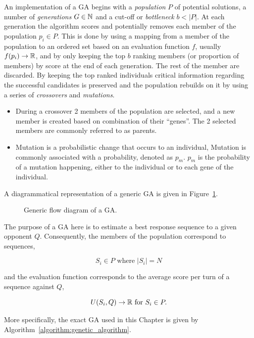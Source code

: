 An implementation of a GA begins with a \textit{population} \(P\) of
potential solutions, a number of \textit{generations} \(G \in \mathbb{N}\) and a cut-off or
\textit{bottleneck} \(b < |P|\). At each generation the algorithm scores and potentially
removes each member of the population \(p_i \in P\). This is done by using a
mapping from a member of the population to an ordered set based on an evaluation
function \(f\), usually \(f(p_i) \to \mathbb{R}\), and by only keeping the top \(b\)
ranking members (or proportion of members) by score at the end of each
generation. The rest of the member are discarded. By keeping the top ranked
individuals critical information regarding the successful candidates is
preserved and the population rebuilds on it by using a series of
\textit{crossovers} and \textit{mutations}.

\begin{itemize}
    \item During a crossover 2 members of the population are selected, and a new
    member is created based on combination of their ``genes''. The 2 selected members
    are commonly referred to as parents.
    \item Mutation is a probabilistic change that occurs to an individual,
    Mutation is commonly associated with a probability, denoted as \(p_m\).
    \(p_m\) is the probability of a mutation happening, either to the individual
    or to each gene of the individual.
\end{itemize}

A diagrammatical representation of a generic GA is given in Figure~\ref{fig:ga_flow_diagram}.

\begin{figure}[!htbp]
    \centering
    
    \caption{Generic flow diagram of a GA.}\label{fig:ga_flow_diagram}
\end{figure}

The purpose of a GA here is to estimate a best response sequence to
a given opponent \(Q\). Consequently, the members of the population correspond to
sequences,

\[S_i \in P \text{ where } |S_i| = N\]

and the evaluation function corresponds to the
average score per turn of a sequence against \(Q\),

\[U(S_i, Q) \to \mathbb{R} \text{ for } S_i \in P.\]

More specifically, the exact GA used in this Chapter is given
by Algorithm~\ref{algorithm:genetic_algorithm}.

